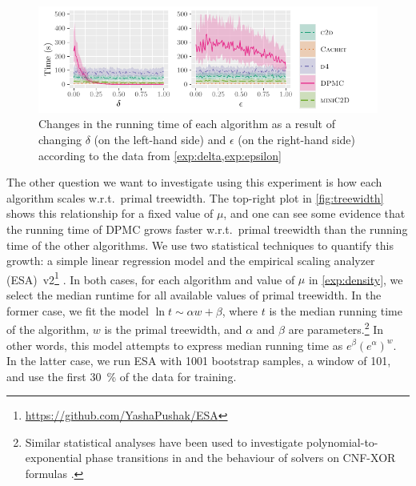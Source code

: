 \begin{figure}[t]
  \centering
  \includegraphics{chapters/comparison/delta_epsilon}
  \caption{Changes in the running time of each algorithm as a result of changing
    $\delta$ (on the left-hand side) and $\epsilon$ (on the right-hand side)
    according to the data from
    \cref{exp:delta,exp:epsilon}}\label{fig:delta_epsilon}
\end{figure}

The other question we want to investigate using this experiment is how each algorithm scales w.r.t.\ primal treewidth. The top-right plot in \cref{fig:treewidth} shows this relationship for a fixed value of $\mu$, and one can see some evidence that the running time of \textsc{DPMC} grows faster w.r.t.\ primal treewidth than the running time of the other algorithms. We use two statistical techniques to quantify this growth: a simple linear regression model and the empirical scaling analyzer (ESA)~v2\footnote{\url{https://github.com/YashaPushak/ESA}} \citep{DBLP:conf/gecco/PushakH20}. In both cases, for each algorithm and value of $\mu$ in \cref{exp:density}, we select the median runtime for all available values of primal treewidth. In the former case, we fit the model $\ln t \sim \alpha w + \beta$, where $t$ is the median running time of the algorithm, $w$ is the primal treewidth, and $\alpha$ and $\beta$ are parameters.\footnote{Similar statistical analyses have been used to investigate polynomial-to-exponential phase transitions in \SAT{} \citep{DBLP:journals/constraints/CoarfaDASV03} and the behaviour of \SAT{} solvers on CNF-XOR formulas \citep{DBLP:conf/ijcai/DudekMV17}.} In other words, this model attempts to express median running time as $e^\beta{(e^\alpha)}^w$. In the latter case, we run ESA with 1001 bootstrap samples, a window of 101, and use the first \SI{30}{\percent} of the data for training.

